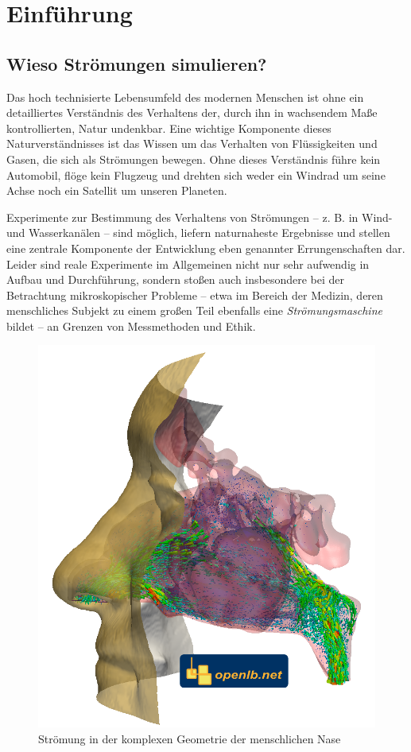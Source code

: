 \section{Einführung}

\subsection{Wieso Strömungen simulieren?}

Das hoch technisierte Lebensumfeld des modernen Menschen ist ohne ein detailliertes Verständnis des Verhaltens der, durch ihn in wachsendem Maße kontrollierten, Natur undenkbar. Eine wichtige Komponente dieses Naturverständnisses ist das Wissen um das Verhalten von Flüssigkeiten und Gasen, die sich als Strömungen bewegen. Ohne dieses Verständnis führe kein Automobil, flöge kein Flugzeug und drehten sich weder ein Windrad um seine Achse noch ein Satellit um unseren Planeten.

Experimente zur Bestimmung des Verhaltens von Strömungen -- z. B. in Wind- und Wasserkanälen -- sind möglich, liefern naturnaheste Ergebnisse und stellen eine zentrale Komponente der Entwicklung eben genannter Errungenschaften dar. Leider sind reale Experimente im Allgemeinen nicht nur sehr aufwendig in Aufbau und Durchführung, sondern stoßen auch insbesondere bei der Betrachtung mikroskopischer Probleme -- etwa im Bereich der Medizin, deren menschliches Subjekt zu einem großen Teil ebenfalls eine \emph{Strömungsmaschine} bildet -- an Grenzen von Messmethoden und Ethik.

\begin{figure}[h]
\centering
\includegraphics[scale=0.35]{img/static/nose.png}
\caption{Strömung in der komplexen Geometrie der menschlichen Nase \cite{olbNose}}
\end{figure}

